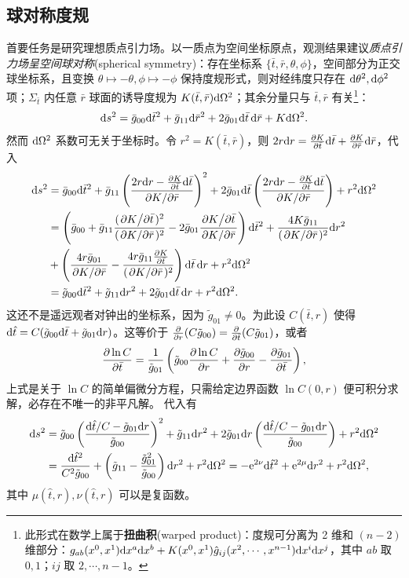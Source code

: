 \subsection{球对称度规}

首要任务是研究理想质点引力场。以一质点为空间坐标原点，观测结果建议\textit{质点引力场呈空间球对称}(spherical symmetry)：存在坐标系 $\{\bar t,\bar r,\theta,\phi\}$，空间部分为正交球坐标系，且变换 $\theta\mapsto -\theta,\phi\mapsto -\phi$ 保持度规形式，则对经纬度只存在 $\dd\theta^2,\dd\phi^2$ 项；$\Sigma_{\bar t}$ 内任意 $\bar r$ 球面的诱导度规为 $K(\bar t,\bar r)\dd\Omega^2$；其余分量只与 $\bar t,\bar r$ 有关\footnote{此形式在数学上属于\textbf{扭曲积}(warped product)：度规可分离为 2 维和 $(n-2)$ 维部分：$g_{ab}(x^0,x^1)\dd x^a\dd x^b+K(x^0,x^1)\hat g_{ij}(x^2,\cdots,x^{n-1})\dd x^i\dd x^j$，其中 $ab$ 取 $0,1$；$ij$ 取 $2,\cdots,n-1$。}：
\[\dd s^2=\bar g_{00}\dd\bar t^2+\bar g_{11}\dd\bar r^2+2\bar g_{01}\dd\bar t\,\dd\bar r+K\dd\Omega^2.\]
然而 $\dd\Omega^2$ 系数可无关于坐标时。令 $r^2=K(\bar t,\bar r)$，则 $2r\dd r=\pdv{K}{\bar t}\dd\bar t+\pdv{K}{\bar r}\dd\bar r$，代入
\begin{align*}
    \dd s^2&=\bar g_{00}\dd\bar t^2+\bar g_{11}\left(\frac{2r\dd r-\pdv{K}{\bar t}\dd\bar t}{\pdv*{K}{\bar r}}\right)^2+2\bar g_{01}\dd\bar t\left(\frac{2r\dd r-\pdv{K}{\bar t}\dd\bar t}{\pdv*{K}{\bar r}}\right)+r^2\dd\Omega^2\\
    &=\left(\bar g_{00}+\bar g_{11}\frac{(\pdv*{K}{\bar t})^2}{(\pdv*{K}{\bar r})^2}-2\bar g_{01}\frac{\pdv*{K}{\bar t}}{\pdv*{K}{\bar r}}\right)\dd\bar t^2+\frac{4K\bar g_{11}}{(\pdv*{K}{\bar r})^2}\dd r^2\\
    &+\left(\frac{4r\bar g_{01}}{\pdv*{K}{\bar r}}-\frac{4r\bar g_{11}\pdv{K}{\bar t}}{(\pdv*{K}{\bar r})^2}\right)\dd\bar t\,\dd r+r^2\dd\Omega^2\\
    &=\tilde g_{00}\dd\bar t^2+\tilde g_{11}\dd r^2+2\tilde g_{01}\dd\bar t\,\dd r+r^2\dd\Omega^2.
\end{align*}
这还不是遥远观者对钟出的坐标系，因为 $\tilde g_{01}\ne 0$。为此设 $C(\bar t,r)$ 使得 $\dd\hat t=C(\tilde g_{00}\dd\bar t+\tilde g_{01}\dd r)$。这等价于 $\pdv{r}(C\tilde g_{00})=\pdv{\bar t}(C\tilde g_{01})$，或者
\[
    \pdv{\ln C}{\bar t}=\frac{1}{\tilde g_{01}}\left(\tilde g_{00}\pdv{\ln C}{r}+\pdv{\tilde g_{00}}{r}-\pdv{\tilde g_{01}}{\bar t}\right),
\]
上式是关于 $\ln C$ 的简单偏微分方程，只需给定边界函数 $\ln C(0,r)$ 便可积分求解，必存在不唯一的非平凡解。
代入有
\begin{align*}
    \dd s^2&=\tilde g_{00}\left(\frac{\dd\hat t/C-\tilde g_{01}\dd r}{\tilde g_{00}}\right)^2+\tilde g_{11}\dd r^2+2\tilde g_{01}\dd r\left(\frac{\dd\hat t/C-\tilde g_{01}\dd r}{\tilde g_{00}}\right)+r^2\dd\Omega^2\\
    &=\frac{\dd\hat t^2}{C^2\tilde g_{00}}+\left(\tilde g_{11}-\frac{\tilde g_{01}^2}{\tilde g_{00}}\right)\dd r^2+r^2\dd\Omega^2=-\mathrm{e}^{2\nu}\dd\hat t^2+\mathrm{e}^{2\mu}\dd r^2+r^2\dd\Omega^2,
\end{align*}
其中 $\mu(\hat t,r),\nu(\hat t,r)$ 可以是复函数。

